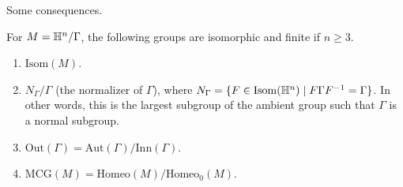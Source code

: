 Some consequences.
\begin{theorem}
    For $M=\mathbb{H}^n  / \Gamma$, the following groups are isomorphic and finite if $n \geq 3$.
    \begin{enumerate}[label=(\arabic*)]
    \setlength\itemsep{-.2em}
\item $\mathrm{Isom}(M)$.
\item $N _{\Gamma}/\Gamma$ (the normalizer of $\Gamma$), where $N_{\Gamma}= \{ F \in  \mathrm{Isom}(\mathbb{H}^n )\mid  F \Gamma F^{-1}=\Gamma\} $. In other words, this is the largest subgroup of the ambient group such that $\Gamma$ is a normal subgroup.
\item $\mathrm{Out}(\Gamma)= \mathrm{Aut}(\Gamma) /  \mathrm{Inn}(\Gamma)$.
\item $\mathrm{MCG}(M)=  \mathrm{Homeo}(M) / \mathrm{Homeo}_0(M)$.
    \end{enumerate}
\end{theorem}
